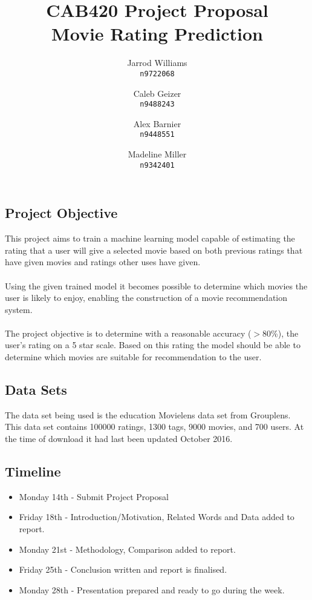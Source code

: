 \documentclass[]{report}   %
\begin{document}
\title{CAB420 Project Proposal \\ \large{Movie Rating Prediction}}   %
\author{
	Jarrod Williams\\
	\texttt{n9722068}
	\and 
	Caleb Geizer\\
	\texttt{n9488243}
	\and
	Alex Barnier\\
	\texttt{n9448551}
	\and	
	Madeline Miller\\
	\texttt{n9342401}
}
\maketitle

\subsection*{Project Objective}
This project aims to train a machine learning model capable of estimating the rating that a user will give a selected movie based on both previous ratings that have given movies and ratings other uses have given. 
\\~\\
Using the given trained model it becomes possible to determine which movies the user is likely to enjoy, enabling the construction of a movie recommendation system.
\\~\\
The project objective is to determine with a reasonable accuracy ($>$80\%), the user's rating on a 5 star scale. Based on this rating the model should be able to determine which movies are suitable for recommendation to the user.
\subsection*{Data Sets}
The data set being used is the education Movielens data set from Grouplens. This data set contains 100000 ratings, 1300 tags, 9000 movies, and 700 users. At the time of download it had last been updated October 2016.

\subsection*{Timeline}
\begin{itemize}
  \item Monday 14th - Submit Project Proposal 
  \item Friday 18th - Introduction/Motivation, Related Words and Data added to report.
  \item Monday 21st - Methodology, Comparison added to report.
  \item Friday 25th - Conclusion written and report is finalised.
  \item Monday 28th - Presentation prepared and ready to go during the week.
\end{itemize}
\end{document}
